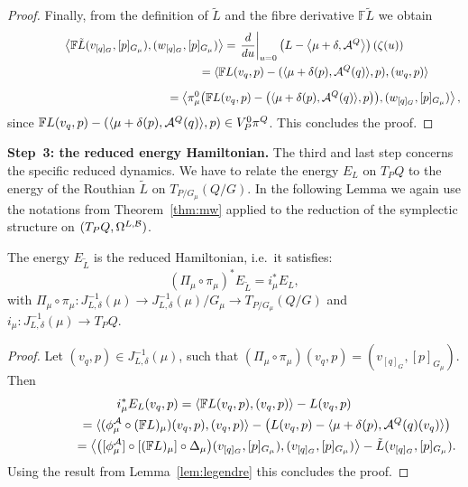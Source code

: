 \documentclass[pdftex]{sigma}
\newcommand{\A}{{\cal A}}
\newcommand{\B}{{\cal B}}
\newcommand{\F}{\mathbb{F}}
\begin{document}
\begin{proof}
Finally, from the def\/inition of $\tilde L$ and the f\/ibre derivative $\F\tilde L$ we obtain
\begin{gather*}
\left\langle \F\tilde L(v_{[q]_G},[p]_{G_\mu}) , (w_{[q]_G},[p]_{G_\mu})\right\rangle
=\left.\frac{d}{du}\right|_{u=0}\left(L - \big\langle\mu+\delta, \A^Q\big\rangle\right)(\zeta(u))\\
\phantom{\left\langle \F\tilde L(v_{[q]_G},[p]_{G_\mu}) , (w_{[q]_G},[p]_{G_\mu})\right\rangle}{}
= \langle \F L(v_q,p)-(\langle\mu+\delta(p),\A^Q(q) \rangle, p),(w_q,p)\rangle\\[2mm]
\phantom{\left\langle \F\tilde L(v_{[q]_G},[p]_{G_\mu}) , (w_{[q]_G},[p]_{G_\mu})\right\rangle}{}
= \left\langle \pi^0_\mu\big(\F L(v_q,p)-\big(\langle \mu+\delta(p),\A^Q(q)\rangle,p\big)\big), (w_{[q]_G},[p]_{G_\mu})\right\rangle,
\end{gather*}
since $\F L(v_q,p)-(\langle \mu+\delta(p),\A^Q(q)\rangle,p) \in V^0_P\pi^Q$. This  concludes the proof.
\end{proof}

{\bf Step~3: the reduced energy Hamiltonian.}
The third and last step concerns the specif\/ic reduced dynamics. We have to relate the energy $E_L$  on $T_PQ$ to the energy of the Routhian $\tilde L$ on $T_{P/G_\mu}(Q/G)$.   In the following Lemma we again use the notations from Theorem~\ref{thm:mw} applied to the reduction of the symplectic structure on $(T_PQ,\Omega^{L,\B})$.
\begin{lemma}\label{lem:energy}
  The energy $E_{\tilde L}$ is the reduced Hamiltonian, i.e.\ it satisfies:
  \[
  (\Pi_\mu\circ\pi_\mu)^*E_{\tilde L} = i^*_\mu E_L,
  \]
  with $\Pi_\mu\circ\pi_\mu: J^{-1}_{L,\delta}(\mu)\to J^{-1}_{L,\delta}(\mu)/G_\mu\to T_{P/G_\mu}(Q/G)$ and $i_\mu:J^{-1}_{L,\delta}(\mu)\to T_PQ$.
\end{lemma}
\begin{proof}
Let $(v_q,p)\in J^{-1}_{L,\delta}(\mu)$, such that $(\Pi_\mu\circ\pi_\mu)(v_q,p)=(v_{[q]_G},[p]_{G_\mu})$. Then
\begin{gather*}
  i^*_\mu E_L(v_q,p) = \langle\F L(v_q,p),(v_q,p)\rangle-L(v_q,p)\\
  \phantom{i^*_\mu E_L(v_q,p)}{}
  = \langle  (\phi^\A_\mu\circ(\F L)_\mu)(v_q,p),(v_q,p)\rangle - \left(L(v_q,p)-\langle \mu+\delta(p),\A^Q(q)(v_q)\rangle\right)\\
 \phantom{i^*_\mu E_L(v_q,p)}{}
 = \left\langle \big([\phi^\A_\mu]\circ[(\F L)_\mu]\circ\Delta_\mu\big)(v_{[q]_G},[p]_{G_\mu}),(v_{[q]_G},[p]_{G_\mu})\right\rangle - \tilde L (v_{[q]_G},[p]_{G_\mu}).
\end{gather*}
Using the result from Lemma~\ref{lem:legendre} this concludes the proof.
\end{proof}
\end{document}
